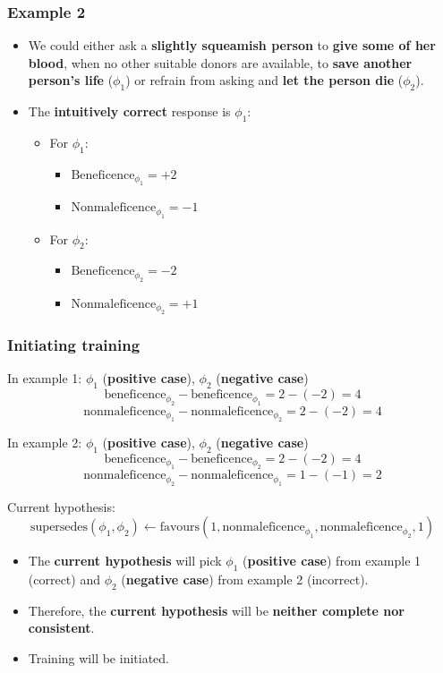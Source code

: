 \documentclass[11pt]{article}
\begin{document}
\subsubsection{Example 2}
\label{sec:org76f6ebf}
\begin{itemize}
\item We could either ask a \textbf{slightly squeamish person} to \textbf{give some of her blood}, when no other suitable donors are available, to \textbf{save another person's life} (\(\phi_1\)) or refrain from asking and \textbf{let the person die} (\(\phi_2\)).
\item The \textbf{intuitively correct} response is \(\phi_1\):
\begin{itemize}
\item For \(\phi_1\):
\begin{itemize}
\item \(\text{Beneficence}_{\phi_1} = + 2\)
\item \(\text{Nonmaleficence}_{\phi_1} = - 1\)
\end{itemize}
\item For \(\phi_2\):
\begin{itemize}
\item \(\text{Beneficence}_{\phi_2} = - 2\)
\item \(\text{Nonmaleficence}_{\phi_2} = + 1\)
\end{itemize}
\end{itemize}
\end{itemize}
\subsubsection{Initiating training}
\label{sec:orgc43c7ab}
In example 1:
\(\phi_1\) (\textbf{positive case}), \(\phi_2\) (\textbf{negative case})
\[\text{beneficence}_{\phi_2} - \text{beneficence}_{\phi_1} = 2 - (-2) = 4\]
\[\text{nonmaleficence}_{\phi_1} - \text{nonmaleficence}_{\phi_2} = 2 - (-2) = 4\]

In example 2:
\(\phi_1\) (\textbf{positive case}), \(\phi_2\) (\textbf{negative case})
\[\text{beneficence}_{\phi_1} - \text{beneficence}_{\phi_2} = 2 - (-2) = 4\]
\[\text{nonmaleficence}_{\phi_2} - \text{nonmaleficence}_{\phi_1} = 1 - (-1) = 2\]

Current hypothesis:
\[\text{supersedes}(\phi_1, \phi_2) \leftarrow \text{favours}(1, \text{nonmaleficence}_{\phi_1}, \text{nonmaleficence}_{\phi_2}, 1)\]
\begin{itemize}
\item The \textbf{current hypothesis} will pick \(\phi_1\) (\textbf{positive case}) from example 1 (correct) and \(\phi_2\) (\textbf{negative case}) from example 2 (incorrect).
\item Therefore, the \textbf{current hypothesis} will be \textbf{neither complete nor consistent}.
\item Training will be initiated.
\end{itemize}
\end{document}
